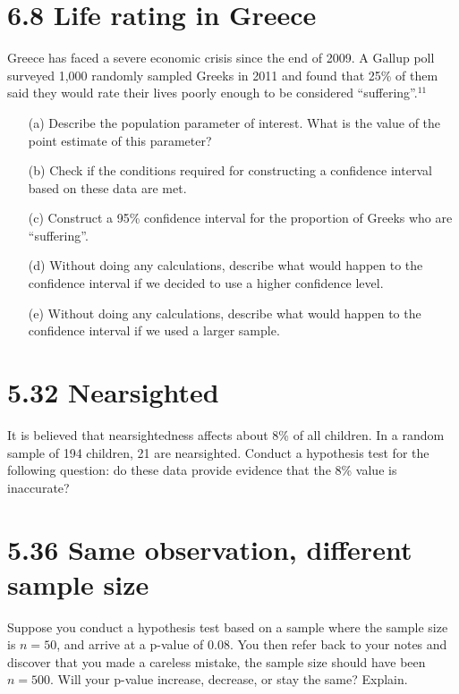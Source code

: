 \documentclass{article}
\begin{document}
\section*{6.8 Life rating in Greece}
Greece has faced a severe economic crisis since the end of 2009. A Gallup poll surveyed 1,000 randomly sampled Greeks in 2011 and found that 25\% of them said they would rate their lives poorly enough to be considered “suffering”.\(^{11}\)
\begin{itemize}
    \item[(a)] Describe the population parameter of interest. What is the value of the point estimate of this parameter?
    \item[(b)] Check if the conditions required for constructing a confidence interval based on these data are met.
    \item[(c)] Construct a 95\% confidence interval for the proportion of Greeks who are “suffering”.
    \item[(d)] Without doing any calculations, describe what would happen to the confidence interval if we decided to use a higher confidence level.
    \item[(e)] Without doing any calculations, describe what would happen to the confidence interval if we used a larger sample.
\end{itemize}

\section*{5.32 Nearsighted}
It is believed that nearsightedness affects about 8\% of all children. In a random sample of 194 children, 21 are nearsighted. Conduct a hypothesis test for the following question: do these data provide evidence that the 8\% value is inaccurate?

\section*{5.36 Same observation, different sample size}
Suppose you conduct a hypothesis test based on a sample where the sample size is \( n = 50 \), and arrive at a p-value of 0.08. You then refer back to your notes and discover that you made a careless mistake, the sample size should have been \( n = 500 \). Will your p-value increase, decrease, or stay the same? Explain.
\end{document}
